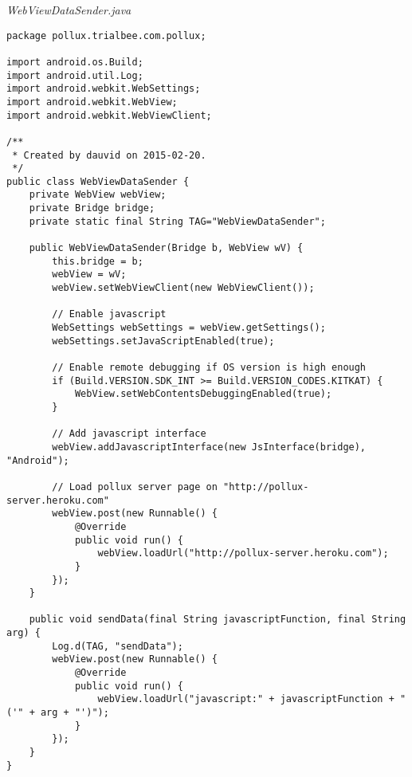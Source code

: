 \emph{WebViewDataSender.java}
\begin{lstlisting}
package pollux.trialbee.com.pollux;

import android.os.Build;
import android.util.Log;
import android.webkit.WebSettings;
import android.webkit.WebView;
import android.webkit.WebViewClient;

/**
 * Created by dauvid on 2015-02-20.
 */
public class WebViewDataSender {
    private WebView webView;
    private Bridge bridge;
    private static final String TAG="WebViewDataSender";

    public WebViewDataSender(Bridge b, WebView wV) {
        this.bridge = b;
        webView = wV;
        webView.setWebViewClient(new WebViewClient());

        // Enable javascript
        WebSettings webSettings = webView.getSettings();
        webSettings.setJavaScriptEnabled(true);

        // Enable remote debugging if OS version is high enough
        if (Build.VERSION.SDK_INT >= Build.VERSION_CODES.KITKAT) {
            WebView.setWebContentsDebuggingEnabled(true);
        }

        // Add javascript interface
        webView.addJavascriptInterface(new JsInterface(bridge), "Android");

        // Load pollux server page on "http://pollux-server.heroku.com"
        webView.post(new Runnable() {
            @Override
            public void run() {
                webView.loadUrl("http://pollux-server.heroku.com");
            }
        });
    }

    public void sendData(final String javascriptFunction, final String arg) {
        Log.d(TAG, "sendData");
        webView.post(new Runnable() {
            @Override
            public void run() {
                webView.loadUrl("javascript:" + javascriptFunction + "('" + arg + "')");
            }
        });
    }
}
\end{lstlisting}

\newpage
